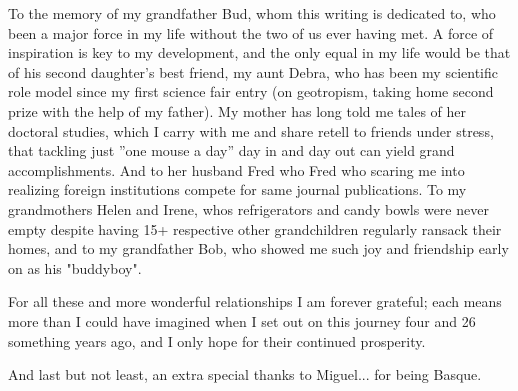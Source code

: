To the memory of my grandfather Bud, whom this writing is dedicated to, who been a major force in my life without the two of us ever having met. A force of inspiration is key to my development, and the only equal in my life would be that of his second daughter's best friend, my aunt Debra, who has been my scientific role model since my first science fair entry (on geotropism, taking home second prize with the help of my father). My mother has long told me tales of her doctoral studies, which I carry with me and share retell to friends under stress, that tackling just ''one mouse a day'' day in and day out can yield grand accomplishments. And to her husband Fred who Fred who scaring me into realizing foreign institutions compete for same journal publications. To my grandmothers Helen and Irene, whos refrigerators and candy bowls were never empty despite having 15+ respective other grandchildren regularly ransack their homes, and to my grandfather Bob, who showed me such joy and friendship early on as his "buddyboy".

For all these and more wonderful relationships I am forever grateful; each means more than I could have imagined when I set out on this journey four and 26 something years ago, and I only hope for their continued prosperity.

And last but not least, an extra special thanks to Miguel... for being Basque.



